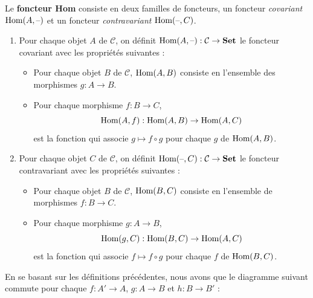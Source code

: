 \documentclass{article}
\begin{document}
\begin{definition}{}
    Le \textbf{foncteur Hom} consiste en deux familles de foncteurs, un foncteur \textit{covariant} $\text{Hom}(A, \text{--})$ et un foncteur \textit{contravariant} $\text{Hom}(\text{--}, C)$.
    \begin{enumerate}
        \item Pour chaque objet $A$ de $\mathcal C$, on définit $\text{Hom}(A,\text{--}):\mathcal C\to\textbf{Set}$ le foncteur covariant avec les propriétés suivantes :
            \begin{itemize}[label=\textbullet]
                \item Pour chaque objet $B$ de $\mathcal C$, $\text{Hom}(A, B)$ consiste en l'ensemble des morphismes $g:A\to B$.
                \item Pour chaque morphisme $f: B\to C$, $$\text{Hom}(A, f):\text{Hom}(A, B)\to\text{Hom}(A, C)$$ est la fonction qui associe $g\mapsto f\circ g$ pour chaque $g$ de $\text{Hom}(A, B)$.
            \end{itemize}
        \item Pour chaque objet $C$ de $\mathcal C$, on définit $\text{Hom}(\text{--}, C):\mathcal C\to\textbf{Set}$ le foncteur contravariant avec les propriétés suivantes :
            \begin{itemize}[label=\textbullet]
                \item Pour chaque objet $B$ de $\mathcal C$, $\text{Hom}(B, C)$ consiste en l'ensemble de morphismes $f:B\to C$.
                \item Pour chaque morphisme $g: A\to B$, $$\text{Hom}(g, C):\text{Hom}(B, C)\to\text{Hom}(A, C)$$ est la fonction qui associe $f\mapsto f\circ g$ pour chaque $f$ de $\text{Hom}(B, C)$.
            \end{itemize}
    \end{enumerate}
\end{definition}

\noindent
En se basant sur les définitions précédentes, nous avons que le diagramme suivant commute pour chaque $f:A'\to A$, $g:A\to B$ et $h: B\to B'$ :

\begin{center}
\end{center}
\end{document}
